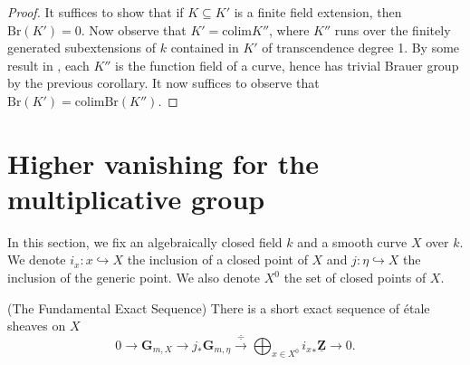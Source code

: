\begin{proof}
It suffices to show that if $K \subseteq K'$ is a finite field extension, then
$\text{Br}(K') = 0$. Now observe that $K' = \text{colim} K''$, where $K''$ runs
over the finitely generated subextensions of $k$ contained in $K'$ of
transcendence degree 1. By some result in \cite{H}, each $K''$ is the function
field of a curve, hence has trivial Brauer group by the previous corollary. It
now suffices to observe that $\text{Br}(K') = \text{colim} \text{Br}(K'')$.
\end{proof}






\section{Higher vanishing for the multiplicative group}
\label{section-higher-Gm}

\noindent
In this section, we fix an algebraically closed field $k$ and a smooth curve
$X$ over $k$. We denote $i_x : x \hookrightarrow X$ the inclusion of a closed
point of $X$ and $j : \eta \hookrightarrow X$ the inclusion of the generic
point. We also denote $X^0$ the set of closed points of $X$.

\begin{theorem}
\label{theorem-fundamental-exact-sequence}
(The Fundamental Exact Sequence)
There is a short exact sequence of \'etale sheaves on $X$
$$
0 \longrightarrow \mathbf{G}_{m,X} \longrightarrow j_* \mathbf{G}_{m,\eta}
\xrightarrow{\ \div\ } \bigoplus_{x \in X^0} {i_x}_* \underline{\mathbf{Z}}
\longrightarrow 0.
$$
\end{theorem}

